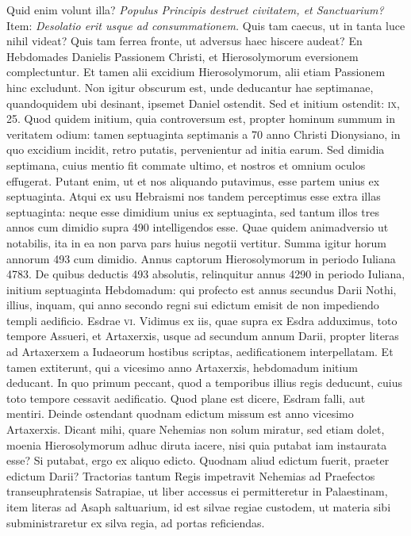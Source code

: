 Quid enim volunt illa?
\textit{Populus Principis destruet civitatem,
et Sanctuarium?}
Item: \textit{Desolatio erit usque ad consummationem.}
Quis tam caecus, ut in tanta luce nihil videat?
Quis tam ferrea fronte, ut adversus haec hiscere audeat?
En Hebdomades
Danielis Passionem Christi, et Hierosolymorum eversionem complectuntur.
Et tamen alii excidium Hierosolymorum, alii etiam
Passionem hinc excludunt.
Non igitur obscurum est, unde deducantur
hae septimanae, quandoquidem ubi desinant, ipsemet Daniel
ostendit.
Sed et initium ostendit: \textsc{ix}, 25.
Quod quidem initium,
quia controversum est, propter hominum summum in veritatem
odium: tamen septuaginta septimanis a 70 anno Christi
Dionysiano, in quo excidium incidit, retro putatis, pervenientur
ad initia earum.
Sed dimidia septimana, cuius mentio fit commate
ultimo, et nostros et omnium oculos effugerat.
Putant enim,
ut et nos aliquando putavimus, esse partem unius ex septuaginta.
Atqui ex usu Hebraismi nos tandem perceptimus esse extra
 illas septuaginta:
neque esse dimidium unius ex septuaginta, sed tantum
illos tres annos cum dimidio supra 490 intelligendos esse.
Quae
quidem animadversio ut notabilis, ita in ea non parva pars huius
negotii vertitur.
Summa igitur horum annorum 493 cum dimidio.
Annus captorum Hierosolymorum in periodo Iuliana 4783.
De quibus deductis 493 absolutis, relinquitur annus 4290 in periodo
Iuliana, initium septuaginta Hebdomadum: qui profecto
est annus secundus Darii Nothi, illius, inquam, qui anno secondo
regni sui edictum emisit de non impediendo templi aedificio.
Esdrae \textsc{vi}.
Vidimus ex iis, quae supra ex Esdra adduximus, toto tempore
Assueri, et Artaxerxis, usque ad secundum annum Darii, propter
literas ad Artaxerxem a Iudaeorum hostibus scriptas, aedificationem
interpellatam.
Et tamen extiterunt, qui a vicesimo anno
Artaxerxis, hebdomadum initium deducant.
In quo primum
peccant, quod a temporibus illius regis deducunt, cuius toto tempore
cessavit aedificatio.
Quod plane est dicere, Esdram falli, aut mentiri.
Deinde ostendant quodnam edictum missum est anno vicesimo
Artaxerxis.
Dicant mihi, quare Nehemias non solum miratur,
sed etiam dolet, moenia Hierosolymorum adhuc diruta iacere,
nisi quia putabat iam instaurata esse?
Si putabat, ergo ex
aliquo edicto.
Quodnam aliud edictum fuerit, praeter edictum
Darii?
Tractorias tantum Regis impetravit Nehemias ad Praefectos
transeuphratensis Satrapiae, ut liber accessus ei permitteretur
in Palaestinam, item literas ad Asaph saltuarium, id est silvae regiae
custodem, ut materia sibi subministraretur ex silva regia, ad
portas reficiendas.

